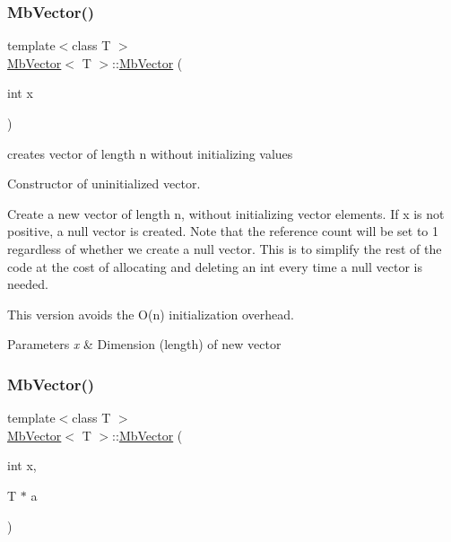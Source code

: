 \subsubsection{\texorpdfstring{MbVector()}{MbVector()}\hspace{0.1cm}{\footnotesize\ttfamily [2/5]}}
{\footnotesize\ttfamily template$<$class T $>$ \\
\mbox{\hyperlink{class_mb_vector}{Mb\+Vector}}$<$ T $>$\+::\mbox{\hyperlink{class_mb_vector}{Mb\+Vector}} (\begin{DoxyParamCaption}\item[{int}]{x }\end{DoxyParamCaption})\hspace{0.3cm}{\ttfamily [explicit]}}



creates vector of length n without initializing values 

Constructor of uninitialized vector.

Create a new vector of length n, without initializing vector elements. If x is not positive, a null vector is created. Note that the reference count will be set to 1 regardless of whether we create a null vector. This is to simplify the rest of the code at the cost of allocating and deleting an int every time a null vector is needed.

This version avoids the O(n) initialization overhead.


\begin{DoxyParams}{Parameters}
{\em x} & Dimension (length) of new vector \\
\hline
\end{DoxyParams}
\mbox{\label{class_mb_vector_ac0a3ab84a77f584df145f16d1f873042}} 
\subsubsection{\texorpdfstring{MbVector()}{MbVector()}\hspace{0.1cm}{\footnotesize\ttfamily [3/5]}}
{\footnotesize\ttfamily template$<$class T $>$ \\
\mbox{\hyperlink{class_mb_vector}{Mb\+Vector}}$<$ T $>$\+::\mbox{\hyperlink{class_mb_vector}{Mb\+Vector}} (\begin{DoxyParamCaption}\item[{int}]{x,  }\item[{T $\ast$}]{a }\end{DoxyParamCaption})}




